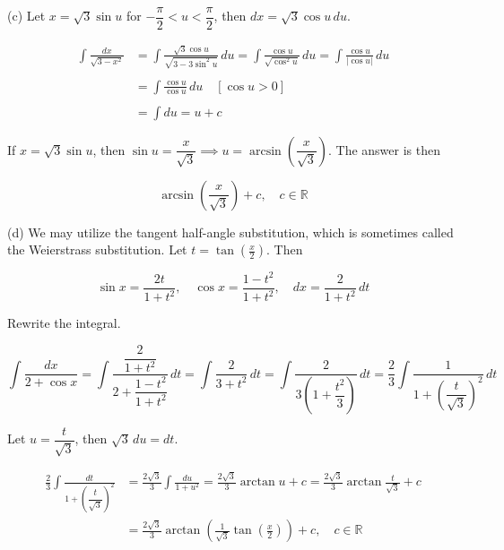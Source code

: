 \documentclass{article}
\begin{document}
\hfill

\noindent (c) Let $x=\sqrt3\sin u$ for $-\dfrac\pi2<u<\dfrac\pi2$, then $dx=\sqrt3\cos u\,du$.

\begin{align*}\int\frac{dx}{\sqrt{3-x^2}}&=\int\frac{\sqrt3\cos u}{\sqrt{3-3\sin^2u}}\,du=\int\frac{\cos u}{\sqrt{\cos^2u}}\,du=\int\frac{\cos u}{|\cos u|}\,du\\\\&=\int\frac{\cos u}{\cos u}\,du\quad\left[\cos u>0\right]\\\\&=\int du=u+c\end{align*}

\hfill

\noindent If $x=\sqrt3\sin u$, then $\sin u=\dfrac x{\sqrt3}\implies u=\arcsin\left(\dfrac x{\sqrt3}\right)$. The answer is then

\hfill

\[\boxed{\arcsin\left(\frac x{\sqrt3}\right)+c,\quad c\in\mathbb{R}}\]

\hfill

\noindent (d) We may utilize the tangent half-angle substitution, which is sometimes called the Weierstrass substitution. Let $\displaystyle t = \tan\left(\frac x2\right)$. Then

\begin{equation*}
\sin x={\frac{2t}{1+t^{2}}},\quad\cos x={\frac{1-t^{2}}{1+t^{2}}},\quad dx={\frac2{1+t^{2}}}\,dt
\end{equation*}

\hfill

\noindent Rewrite the integral.

\[\int\frac{dx}{2+\cos x}=\int\frac{\dfrac2{1+t^2}}{2+\dfrac{1-t^2}{1+t^2}}\,dt=\int\frac{2}{3+t^2}\,dt=\int\frac{2}{3\left(1+\dfrac{t^2}3\right)}\,dt=\frac23\int\frac1{1+\left(\dfrac t{\sqrt3}\right)^2}\,dt\]

\hfill

\noindent Let $u=\dfrac t{\sqrt3}$, then $\sqrt3\,du=dt$.

\begin{align*}\frac23\int\frac{dt}{1+\left(\dfrac t{\sqrt3}\right)^2}&=\frac{2\sqrt3}3\int\frac{du}{1+u^2}=\frac{2\sqrt3}3\arctan u+c=\frac{2\sqrt3}3\arctan\frac t{\sqrt3}+c\\&=\boxed{\frac{2\sqrt3}3\arctan\left(\frac1{\sqrt3}\tan\left(\frac x2\right)\right)+c,\quad c\in\mathbb{R}}\end{align*}

\hfill
\end{document}
